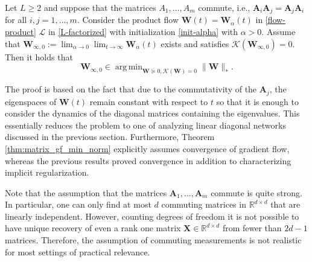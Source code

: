 \documentclass{svproc}
\newcommand{\bA}{\boldsymbol{A}}
\newcommand{\bW}{\boldsymbol{W}}
\newcommand{\bX}{\boldsymbol{X}}
\newcommand{\0}{\boldsymbol{0}}
\newcommand{\1}{\boldsymbol{1}}
\DeclareMathOperator*{\argmin}{arg\,min}
\renewcommand{\tilde}{\widetilde}
\def\R{\mathbb{R}}
\def\Lln{\mathcal{L}_\text{ln}}
\def\bWprod{\tilde{\bW}}
\begin{document}
\begin{theorem}\label{thm:matrix_gf_min_norm}
Let $L \geq 2$ and suppose that the matrices $A_1,\ldots,A_m$ commute, i.e., $\bA_i \bA_j = \bA_j \bA_i$ for all $i,j = 1,\hdots,m$. Consider the product flow $\bW(t)=\bW_{\alpha}(t)$ in \eqref{flow-product} 
$\mathcal{L}$ in \eqref{L-factorized} with initialization \eqref{init-alpha} with $\alpha > 0$. Assume that $\bW_{\infty,0}:=\lim_{\alpha\to 0} \lim_{t \to \infty} \bW_{\alpha}(t)$ exists and satisfies $\mathcal{K}(\bW_{\infty,0}) = 0$.
 Then it holds that
    \begin{equation}\label{eq:min_nuc}
        \bW_{\infty,0}\in\argmin_{\bW\succeq 0,\mathcal{K}(\bW)=0}\|\bW\|_*.
    \end{equation}
\end{theorem}

The proof is based on the fact that due to the commutativity of the $\bA_j$, the eigenspaces of $\bW(t)$ remain constant with respect to $t$ so that it is enough to consider the dynamics of the diagonal matrices containing the eigenvalues. This essentially reduces the problem  to one of analyzing linear diagonal networks discussed in the previous section. 
Furthermore, Theorem \ref{thm:matrix_gf_min_norm} explicitly assumes convergence of gradient flow, whereas the previous results proved convergence in addition to characterizing implicit regularization.

Note that the assumption that the matrices $\bA_1,\hdots,\bA_m$ commute is quite strong. In particular, one can only find at most $d$ commuting matrices in $\R^{d \times d}$ that are linearly independent. However, counting degrees of freedom it is not possible to have unique recovery of even a rank one matrix $\bX \in \R^{d \times d}$ from fewer than $2d-1$ matrices. Therefore, the assumption of commuting measurements is not realistic for most settings of practical relevance.
\end{document}
